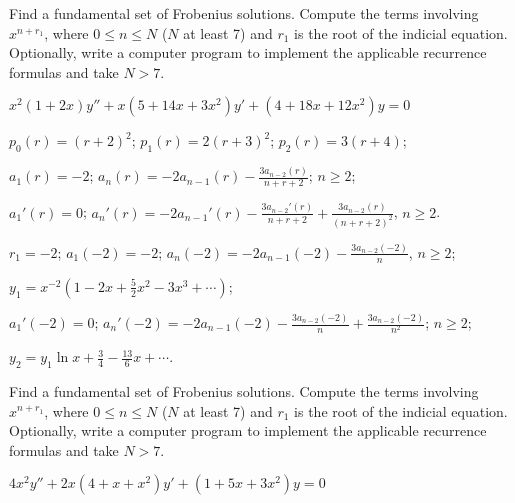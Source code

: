 \documentclass{ximera}
\begin{document}
\begin{problem}\label{exer:7.6.8}
Find a fundamental set of Frobenius solutions. Compute the terms involving $x^{n+r_1}$, where $0\leq n \leq N$ ($N$ at least 7) and $r_1$ is the root of the indicial equation. Optionally, write a computer
program to implement the applicable recurrence formulas and take $N > 7$.

$x^2(1+2x)y''+x(5+14x+3x^2)y'+(4+18x+12x^2)y=0$

\begin{solution}
    $p_0(r)=(r+2)^2$;
$p_1(r)=2(r+3)^2$;
$p_2(r)=3(r+4)$;

$a_1(r)=-2$;
$a_n(r)=
-2a_{n-1}(r)-\frac{3a_{n-2}(r)}{ n+r+2}$;
$n\geq 2$;


$a_1'(r)=0$;
$a_n'(r)=
-2a_{n-1}'(r)-\frac{3a_{n-2}'(r)}{ n+r+2}
+\frac{3a_{n-2}(r)}{(n+r+2)^2}$,
$n\geq 2$.

$r_1=-2$;
$a_1(-2)=-2$;
$a_n(-2)=
-2a_{n-1}(-2)-\frac{3a_{n-2}(-2)}{ n}$,
$n\geq 2$;

$y_1=x^{-2}\left(1-2x+\frac{5}{2}x^2-3x^3+\cdots\right)$;

$a_1'(-2)=0$;
$a_n'(-2)=
-2a_{n-1}(-2)-\frac{3a_{n-2}(-2)}{ n}+\frac{3a_{n-2}(-2)}{ n^2}$;
$n\geq 2$;

$y_2=y_1\ln x+\frac{3}{4}-\frac{13}{6}x+\cdots$.

\end{solution}

\end{problem}

\begin{problem}\label{exer:7.6.9}
Find a fundamental set of Frobenius solutions. Compute the terms involving $x^{n+r_1}$, where $0\leq n \leq N$ ($N$ at least 7) and $r_1$ is the root of the indicial equation. Optionally, write a computer
program to implement the applicable recurrence formulas and take $N > 7$.

$4x^2y''+2x(4+x+x^2)y'+(1+5x+3x^2)y=0$
\end{problem}
\end{document}
